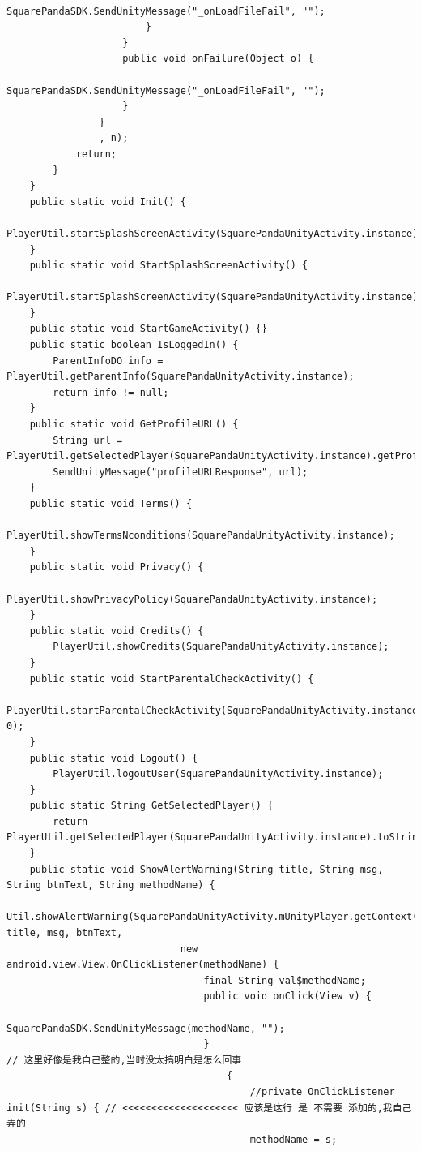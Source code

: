 \documentclass[9pt, b5paper]{article}
\begin{document}
\begin{verbatim}
                            SquarePandaSDK.SendUnityMessage("_onLoadFileFail", "");
                        }
                    }
                    public void onFailure(Object o) {
                        SquarePandaSDK.SendUnityMessage("_onLoadFileFail", "");
                    }
                }
                , n);
            return;
        }
    }
    public static void Init() {
        PlayerUtil.startSplashScreenActivity(SquarePandaUnityActivity.instance);
    }
    public static void StartSplashScreenActivity() {
        PlayerUtil.startSplashScreenActivity(SquarePandaUnityActivity.instance);
    }
    public static void StartGameActivity() {}
    public static boolean IsLoggedIn() {
        ParentInfoDO info = PlayerUtil.getParentInfo(SquarePandaUnityActivity.instance);
        return info != null;
    }
    public static void GetProfileURL() {
        String url = PlayerUtil.getSelectedPlayer(SquarePandaUnityActivity.instance).getProfileURL();
        SendUnityMessage("profileURLResponse", url);
    }
    public static void Terms() {
        PlayerUtil.showTermsNconditions(SquarePandaUnityActivity.instance);
    }
    public static void Privacy() {
        PlayerUtil.showPrivacyPolicy(SquarePandaUnityActivity.instance);
    }
    public static void Credits() {
        PlayerUtil.showCredits(SquarePandaUnityActivity.instance);
    }
    public static void StartParentalCheckActivity() {
        PlayerUtil.startParentalCheckActivity(SquarePandaUnityActivity.instance, 0);
    }
    public static void Logout() {
        PlayerUtil.logoutUser(SquarePandaUnityActivity.instance);
    }
    public static String GetSelectedPlayer() {
        return PlayerUtil.getSelectedPlayer(SquarePandaUnityActivity.instance).toString();
    }
    public static void ShowAlertWarning(String title, String msg, String btnText, String methodName) {
        Util.showAlertWarning(SquarePandaUnityActivity.mUnityPlayer.getContext(), title, msg, btnText,
                              new android.view.View.OnClickListener(methodName) {
                                  final String val$methodName; 
                                  public void onClick(View v) {
                                      SquarePandaSDK.SendUnityMessage(methodName, "");
                                  }
// 这里好像是我自己整的,当时没太搞明白是怎么回事                                  
                                      {
                                          //private OnClickListener init(String s) { // <<<<<<<<<<<<<<<<<<<< 应该是这行 是 不需要 添加的,我自己弄的
                                          methodName = s;

\end{verbatim}
\end{document}
